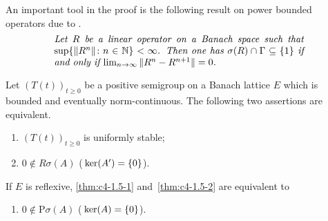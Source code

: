 An important tool in the proof is the following result on power bounded operators due to \textcite{katznelsontzafriri:1984}.
\begin{equation}\label{eq:c4-1.4}
\begin{minipage}{.75\linewidth}
\textit{Let $R$ be a linear operator on a Banach space such that $\sup\{ \|R^{n}\| \colon n \in \N \} < \infty$. 
Then one has $\sigma(R) \cap \Gamma \subseteq \{1\}$ if and only if 
$ \lim_{n \to \infty} \|R^{n} - R^{n+1}\| = 0$.}
\end{minipage}
\end{equation}
\begin{theorem}\label{thm:c4-1.5}%
Let $(T(t))_{t\geq 0}$ be a positive semigroup on a Banach lattice $E$ which is bounded and eventually norm-continuous.
The following two assertions are equivalent.
\begin{enumerate}[\upshape (a)]
    \item \label{thm:c4-1.5-1}
    $(T(t))_{t\geq 0}$ is uniformly stable;
    
    \item \label{thm:c4-1.5-2}
    $0 \notin R\sigma(A)$ (\ie  $\mathop{}\mathrm{ker}(A') 
    = \{0\}$).
\end{enumerate}
If $E$ is reflexive, \ref{thm:c4-1.5-1} and~\ref{thm:c4-1.5-2} are equivalent to
\begin{enumerate}

\item  \label{thm:c4-1.5-3}
$0 \notin \text{P}\sigma(A)$ (\ie  $\mathop{}\mathrm{ker}(A) = \{0\}$).
\end{enumerate}
\end{theorem}
